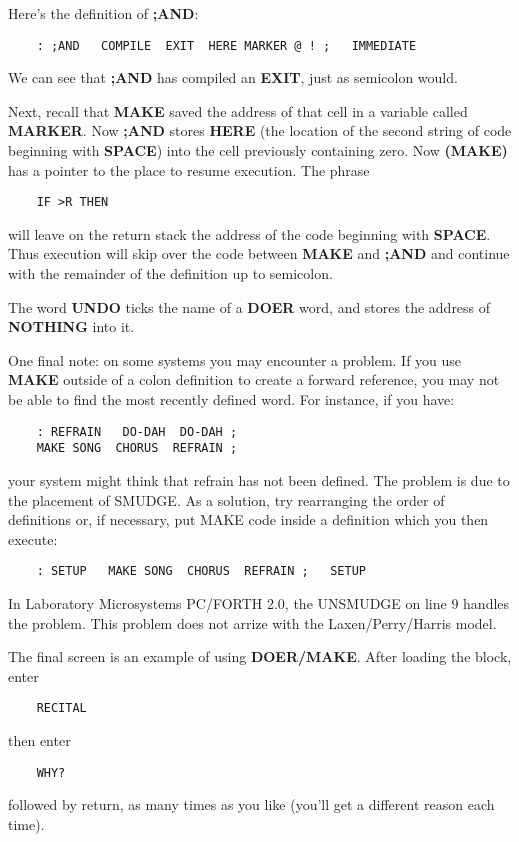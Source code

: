 Here's the definition of {\bf ;AND}:
\begin{verbatim}
    : ;AND   COMPILE  EXIT  HERE MARKER @ ! ;   IMMEDIATE
\end{verbatim}
We can see that {\bf ;AND} has compiled an {\bf EXIT}, just as semicolon would.

Next, recall that {\bf MAKE} saved the address of that cell in a variable
called {\bf MARKER}.  Now {\bf ;AND} stores {\bf HERE} (the location of the second
string of code beginning with {\bf SPACE}) into the cell previously containing
zero.  Now {\bf (MAKE)} has a pointer to the place to resume execution.  The
phrase
\begin{verbatim}
    IF >R THEN
\end{verbatim}
will leave on the return stack the address of the code beginning with 
{\bf SPACE}.  Thus execution will skip over the code between {\bf MAKE} and 
{\bf ;AND} and continue with the remainder of the definition up to semicolon.

The word {\bf UNDO} ticks the name of a {\bf DOER} word, and stores the
address of {\bf NOTHING} into it.

One final note:  on some systems you may encounter a problem.  If
you use {\bf MAKE} outside of a colon definition to create a forward reference,
you may not be able to find the most recently defined word.  For instance,
if you have:
\begin{verbatim}
    : REFRAIN   DO-DAH  DO-DAH ;
    MAKE SONG  CHORUS  REFRAIN ;
\end{verbatim}
your system might think that refrain has not been defined.  The problem
is due to the placement of SMUDGE.  As a solution, try rearranging
the order of definitions or, if necessary, put MAKE code inside a 
definition which you then execute:
\begin{verbatim}
    : SETUP   MAKE SONG  CHORUS  REFRAIN ;   SETUP
\end{verbatim}
In Laboratory Microsystems PC/FORTH 2.0, the UNSMUDGE on line 9 
handles the problem.  This problem does not arrize with the Laxen/Perry/Harris
model.

The final screen is an example of using {\bf DOER/MAKE}.  After loading 
the block, enter
\begin{verbatim}
    RECITAL
\end{verbatim}
then enter 
\begin{verbatim}
    WHY?
\end{verbatim}
followed by return, as many times as you like (you'll get a different
reason each time).

